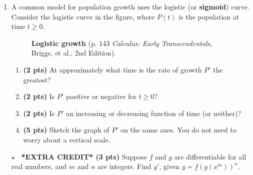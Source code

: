 \documentclass[12pt]{article}
\begin{document}
\begin{enumerate}[1.]


\newpage
\item %
A common model for population growth uses the logistic (or \textbf{sigmoid}) curve.  Consider the logistic curve in the figure, where $P(t)$ is the population at time $t\geq 0$.

\begin{figure}[h]
\caption*{\textbf{Logistic growth} (p. 143 \emph{Calculus: Early Transcendentals}, Briggs, et al., 2nd Edition).}
\end{figure}

\begin{enumerate}
	\item {\bf (2 pts)} At approximately what time is the rate of growth $P'$ the greatest?
	\vspace{3pc}
	
	\item {\bf (2 pts)} Is $P'$ positive or negative for $t\geq 0$?
	\vspace{3pc}
	
	\item {\bf (2 pts)} Is $P'$ an increasing or decreasing function of time (or neither)?
	\vspace{3pc}
	
	\item {\bf (5 pts)} Sketch the graph of $P'$ on the same axes.  You do not need to worry about a vertical scale.  
	\vspace{2pc}	
\end{enumerate}

\item[\Huge$\star$] {\bf ~*EXTRA CREDIT* (3 pts)} %
Suppose $f$ and $g$ are differentiable for all real numbers, and $m$ and $n$ are integers.  Find $y'$, given $y=f(g(x^m))^n$.
\vspace{5pc}

\end{enumerate}
\end{document}
